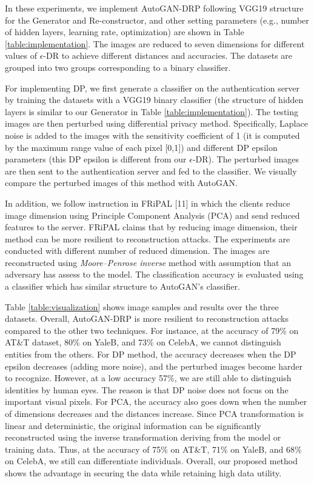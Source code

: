 In these experiments, we implement AutoGAN-DRP following VGG19 structure for the Generator and Re-constructor, and other setting parameters (e.g., number of hidden layers, learning rate, optimization) are shown in Table \ref{table:implementation}. The images are reduced to seven dimensions for different values of $\epsilon$-DR to achieve different distances and accuracies. The datasets are grouped into two groups corresponding to a binary classifier. 

For implementing DP, we first generate a classifier on the authentication server by training the datasets with a VGG19 binary classifier (the structure of hidden layers is similar to our Generator in Table \ref{table:implementation}). The testing images are then perturbed using differential privacy method. Specifically, Laplace noise is added to the images with the sensitivity coefficient of 1 (it is computed by the maximum range value of each pixel [0,1]) and different DP epsilon parameters (this DP epsilon is different from our $\epsilon$-DR). The perturbed images are then sent to the authentication server and fed to the classifier. We visually compare the perturbed images of this method with AutoGAN. 

In addition, we follow instruction in FRiPAL [11] in which the clients reduce image dimension using Principle Component Analysis (PCA) and send reduced features to the server. FRiPAL claims that by reducing image dimension, their method can be more resilient to reconstruction attacks. The experiments are conducted with different number of reduced dimension. The images are reconstructed using \textit{Moore–Penrose inverse} method with assumption that an adversary has assess to the model. The classification accuracy is evaluated using a classifier which has similar structure to AutoGAN's classifier. 

Table \ref{table:visualization} shows image samples and results over the three datasets. Overall, AutoGAN-DRP is more resilient to reconstruction attacks compared to the other two techniques. For instance, at the accuracy of 79\% on AT\&T dataset, 80\% on YaleB, and 73\% on CelebA, we cannot distinguish entities from the others. For DP method, the accuracy decreases when the DP epsilon decreases (adding more noise), and the perturbed images become harder to recognize. However, at a low accuracy 57\%, we are still able to distinguish identities by human eyes. The reason is that DP noise does not focus on the important visual pixels. For PCA, the accuracy also goes down when the number of dimensions decreases and the distances increase. Since PCA transformation is linear and deterministic, the original information can be significantly reconstructed using the inverse transformation deriving from the model or training data. Thus, at the accuracy of 75\% on AT\&T, 71\% on YaleB, and 68\% on CelebA, we still can differentiate individuals. Overall, our proposed method shows the advantage in securing the data while retaining high data utility.       
\\ 
\setcounter{table}{1}

